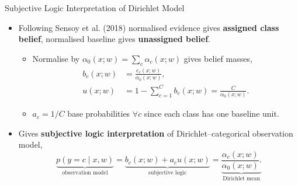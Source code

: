     \begin{frame}{Subjective Logic Interpretation of Dirichlet Model}
    \label{frm:backup-opinion-dirichlet}
    \label{frm:backup-edl-evidence}
    \setlength{\abovedisplayskip}{5pt}
    \setlength{\belowdisplayskip}{5pt}
    \begin{itemize}
    \setlength{\itemsep}{2mm}
    \item Following Sensoy et al. (2018) normalised evidence gives \textbf{assigned class belief}, normalised baseline gives \textbf{unassigned belief}.
    \begin{itemize}
    \item Normalise by $\alpha_0(x;w)=\sum_c\alpha_c(x;w)$ gives belief masses,
    \[
    \begin{aligned}
    b_c(x;w)&=\frac{e_c(x;w)}{\alpha_0(x;w)},\\[2mm]
    u(x;w)&=1-\sum_{c=1}^{C}b_c(x;w)=\frac{C}{\alpha_0(x;w)}.
    \end{aligned}
    \]
    \item $a_c=1/C$ base probabilities $\forall c$ since each class has one baseline unit.
    \end{itemize}
    \item Gives \textbf{subjective logic interpretation} of Dirichlet--categorical observation model,
    \[
    \underbrace{p(y=c\mid x,w)}_{\text{observation model}}
    =
    \underbrace{b_c(x;w)+a_cu(x;w)}_{\text{subjective logic}}
    =
    \underbrace{\frac{\alpha_c(x;w)}{\alpha_0(x;w)}.}_{\text{Dirichlet mean}}
    \]
    \end{itemize}
    \end{frame}

